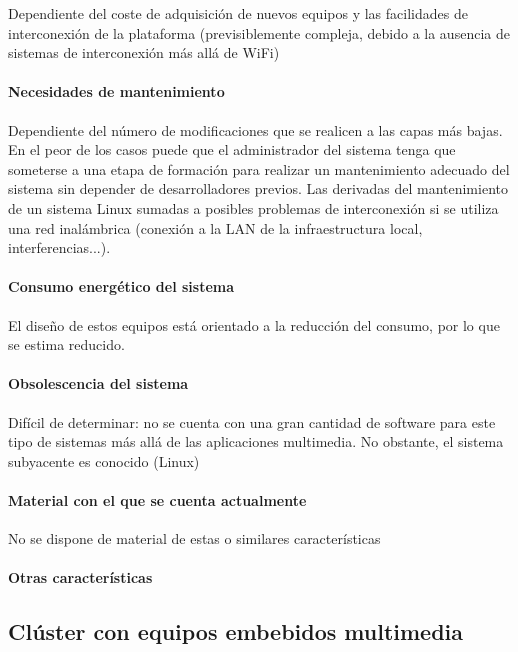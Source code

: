 Dependiente del coste de adquisición de nuevos equipos y las facilidades de interconexión de la plataforma (previsiblemente compleja, debido a la ausencia de sistemas de interconexión más allá de WiFi)

\paragraph{Necesidades de mantenimiento}

Dependiente del número de modificaciones que se realicen a las capas más bajas. En el peor de los casos puede que el administrador del sistema tenga que someterse a una etapa de formación para realizar un mantenimiento adecuado del sistema sin depender de desarrolladores previos.
Las derivadas del mantenimiento de un sistema Linux sumadas a posibles problemas de interconexión si se utiliza una red inalámbrica (conexión a  la LAN de la infraestructura local, interferencias...).

\paragraph{Consumo energético del sistema}

El diseño de estos equipos está orientado a la reducción del consumo, por lo que se estima reducido.

\paragraph{Obsolescencia del sistema}

Difícil de determinar: no se cuenta con una gran cantidad de software para este tipo de sistemas más allá de las aplicaciones multimedia. No obstante, el sistema subyacente es conocido (Linux)

\paragraph{Material con el que se cuenta actualmente}

No se dispone de material de estas o similares características

\paragraph{Otras características}

\subsection{Clúster con equipos embebidos multimedia }

